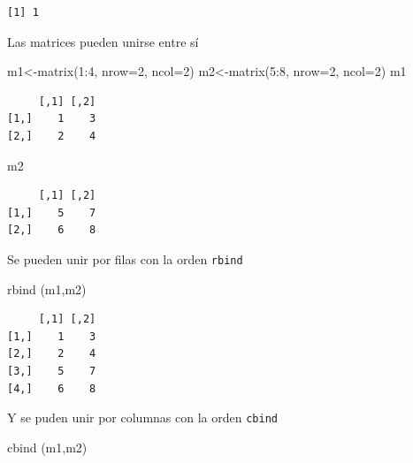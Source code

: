 \documentclass[
  letterpaper,
  DIV=11,
  numbers=noendperiod]{scrreprt}
\newenvironment{Shaded}{\begin{snugshade}}{\end{snugshade}}
\newcommand{\AttributeTok}[1]{\textcolor[rgb]{0.40,0.45,0.13}{#1}}
\newcommand{\DecValTok}[1]{\textcolor[rgb]{0.68,0.00,0.00}{#1}}
\newcommand{\FunctionTok}[1]{\textcolor[rgb]{0.28,0.35,0.67}{#1}}
\newcommand{\NormalTok}[1]{\textcolor[rgb]{0.00,0.23,0.31}{#1}}
\newcommand{\OtherTok}[1]{\textcolor[rgb]{0.00,0.23,0.31}{#1}}
\newcommand{\SpecialCharTok}[1]{\textcolor[rgb]{0.37,0.37,0.37}{#1}}
\begin{document}
\begin{verbatim}
[1] 1
\end{verbatim}

Las matrices pueden unirse entre sí

\begin{Shaded}
\begin{Highlighting}[]
\NormalTok{m1}\OtherTok{\textless{}{-}}\FunctionTok{matrix}\NormalTok{(}\DecValTok{1}\SpecialCharTok{:}\DecValTok{4}\NormalTok{, }\AttributeTok{nrow=}\DecValTok{2}\NormalTok{, }\AttributeTok{ncol=}\DecValTok{2}\NormalTok{)}
\NormalTok{m2}\OtherTok{\textless{}{-}}\FunctionTok{matrix}\NormalTok{(}\DecValTok{5}\SpecialCharTok{:}\DecValTok{8}\NormalTok{, }\AttributeTok{nrow=}\DecValTok{2}\NormalTok{, }\AttributeTok{ncol=}\DecValTok{2}\NormalTok{)}
\NormalTok{m1}
\end{Highlighting}
\end{Shaded}

\begin{verbatim}
     [,1] [,2]
[1,]    1    3
[2,]    2    4
\end{verbatim}

\begin{Shaded}
\begin{Highlighting}[]
\NormalTok{m2}
\end{Highlighting}
\end{Shaded}

\begin{verbatim}
     [,1] [,2]
[1,]    5    7
[2,]    6    8
\end{verbatim}

Se pueden unir por filas con la orden \texttt{rbind}

\begin{Shaded}
\begin{Highlighting}[]
\FunctionTok{rbind}\NormalTok{ (m1,m2)}
\end{Highlighting}
\end{Shaded}

\begin{verbatim}
     [,1] [,2]
[1,]    1    3
[2,]    2    4
[3,]    5    7
[4,]    6    8
\end{verbatim}

Y se puden unir por columnas con la orden \texttt{cbind}

\begin{Shaded}
\begin{Highlighting}[]
\FunctionTok{cbind}\NormalTok{ (m1,m2)}
\end{Highlighting}
\end{Shaded}
\end{document}
